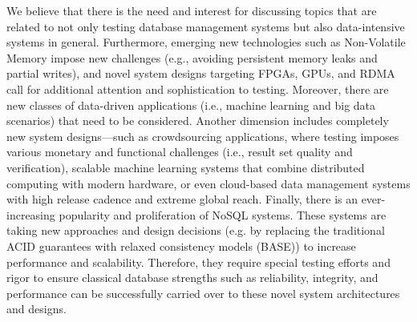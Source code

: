 \documentclass[sigconf]{acmart}
\begin{document}
We believe that there is the need and interest for discussing topics that are related to not only testing database management systems but also data-intensive systems in general.
Furthermore, emerging new technologies such as Non-Volatile Memory impose new challenges (e.g., avoiding persistent memory leaks and partial writes), and novel system designs targeting FPGAs, GPUs, and RDMA call for additional attention and sophistication to testing.
Moreover, there are new classes of data-driven applications (i.e., machine learning and big data scenarios) that need to be considered.
Another dimension includes completely new system designs---such as crowdsourcing applications, where testing imposes various monetary and functional challenges (i.e., result set quality and verification), scalable machine learning systems that combine distributed computing with modern hardware, or even cloud-based data management systems with high release cadence and extreme global reach.
Finally, there is an ever-increasing popularity and proliferation of NoSQL systems.
These systems are taking new approaches and design decisions (e.g. by replacing the traditional ACID guarantees with relaxed consistency models (BASE)) to increase performance and scalability.
Therefore, they require special testing efforts and rigor to ensure classical database strengths such as reliability, integrity, and performance can be successfully carried over to these novel system architectures and designs.
\end{document}
